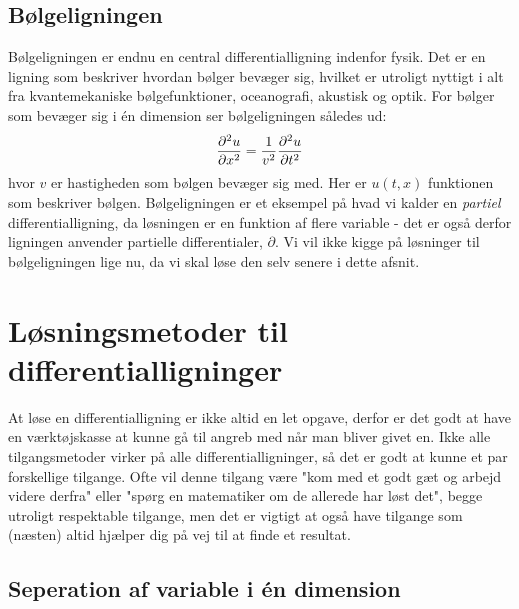 \documentclass[crop=false, class=memoir]{standalone}
\begin{document}
\subsection{Bølgeligningen}

Bølgeligningen er endnu en central differentialligning indenfor fysik. Det er en ligning som beskriver hvordan bølger bevæger sig, hvilket er utroligt nyttigt i alt fra kvantemekaniske bølgefunktioner, oceanografi, akustisk og optik. For bølger som bevæger sig i én dimension ser bølgeligningen således ud:
\begin{align}
    \pdv[2]{u}{x} = \frac{1}{v^2}\pdv[2]{u}{t}
    \label{matf:eq:wave}
\end{align}
hvor $v$ er hastigheden som bølgen bevæger sig med. Her er $u(t,x)$ funktionen som beskriver bølgen. Bølgeligningen er et eksempel på hvad vi kalder en \emph{partiel} differentialligning, da løsningen er en funktion af flere variable - det er også derfor ligningen anvender partielle differentialer, $\partial$. Vi vil ikke kigge på løsninger til bølgeligningen lige nu, da vi skal løse den selv senere i dette afsnit. 

\section{Løsningsmetoder til differentialligninger}

At løse en differentialligning er ikke altid en let opgave, derfor er det godt at have en værktøjskasse at kunne gå til angreb med når man bliver givet en. Ikke alle tilgangsmetoder virker på alle differentialligninger, så det er godt at kunne et par forskellige tilgange. Ofte vil denne tilgang være "kom med et godt gæt og arbejd videre derfra" eller "spørg en matematiker om de allerede har løst det", begge utroligt respektable tilgange, men det er vigtigt at også have tilgange som (næsten) altid hjælper dig på vej til at finde et resultat.

\subsection{Seperation af variable i én dimension}
\end{document}
